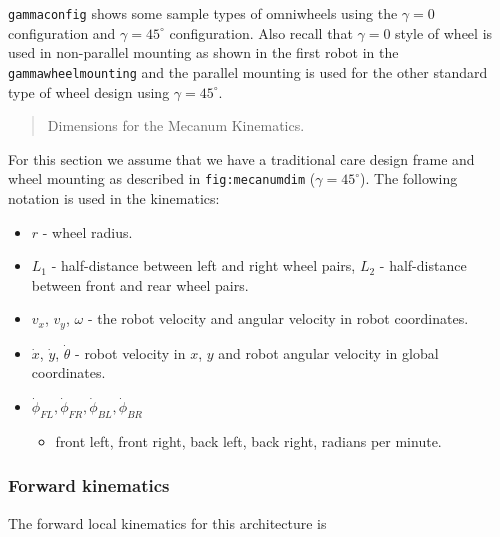 \texttt{gammaconfig} shows some sample types of omniwheels using the
\(\gamma = 0\) configuration and \(\gamma = 45^\circ\) configuration.
Also recall that \(\gamma=0\) style of wheel is used in non-parallel
mounting as shown in the first robot in the \texttt{gammawheelmounting}
and the parallel mounting is used for the other standard type of wheel
design using \(\gamma = 45^\circ\).

\begin{quote}
Dimensions for the Mecanum Kinematics.
\end{quote}

For this section we assume that we have a traditional care design frame
and wheel mounting as described in \texttt{fig:mecanumdim}
(\(\gamma = 45^\circ\)). The following notation is used in the
kinematics:

\begin{itemize}
\tightlist
\item
  \(r\) - wheel radius.
\item
  \(L_1\) - half-distance between left and right wheel pairs, \(L_2\) -
  half-distance between front and rear wheel pairs.
\item
  \(v_x\), \(v_y\), \(\omega\) - the robot velocity and angular velocity
  in robot coordinates.
\item
  \(\dot{x}\), \(\dot{y}\), \(\dot{\theta}\) - robot velocity in \(x\),
  \(y\) and robot angular velocity in global coordinates.
\item
  \(\dot{\phi}_{FL}, \dot{\phi}_{FR},  \dot{\phi}_{BL}, \dot{\phi}_{BR}\)

  \begin{itemize}
  \tightlist
  \item
    front left, front right, back left, back right, radians per minute.
  \end{itemize}
\end{itemize}

\hypertarget{forward-kinematics}{%
\subsubsection{Forward kinematics}\label{forward-kinematics}}

The forward local kinematics for this architecture is

